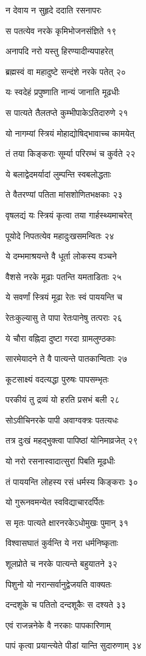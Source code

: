न देवाय न सुहृदे ददाति रसनापरः

स पतत्येव नरके कृमिभोजनसंज्ञिते १९

अनापदि नरो यस्तु हिरण्यादीन्यपाहरेत्

ब्रह्मस्वं वा महादुष्टे सन्दंशे नरके पतेत् २०

यः स्वदेहं प्रपुष्णाति नान्यं जानाति मूढधीः

स पात्यते तैलतप्ते कुम्भीपाकेऽतिदारुणे २१

यो नागम्यां स्त्रियं मोहाद्योषिद्भावाच्च कामयेत्

तं तया किङ्कराः सूर्म्या परिरम्भं च कुर्वते २२

ये बलाद्वेदमर्यादां लुम्पन्ति स्वबलोद्धताः

ते वैतरण्यां पतिता मांसशोणितभक्षकाः २३

वृषलद्यं यः स्त्रियं कृत्वा तया गार्हस्थ्यमाचरेत्

पूयोदे निपतत्येव महादुःखसमन्वितः २४

ये दम्भमाश्रयन्ते वै धूर्ता लोकस्य वञ्चने

वैशसे नरके मूढाः पतन्ति यमताडिताः २५

ये सवर्णां स्त्रियं मूढा रेतः स्वं पाययन्ति च

रेतःकुल्यासु ते पापा रेतःपानेषु तत्पराः २६

ये चौरा वह्निदा दुष्टा गरदा ग्रामलुण्ठकाः

सारमेयादने ते वै पात्यन्ते पातकान्विताः २७

कूटसाक्ष्यं वदत्यद्धा पुरुषः पापसम्भृतः

परकीयं तु द्रव्यं यो हरति प्रसभं बली २८

सोऽवीचिनरके पापी अवाग्वक्त्रः पतत्यधः

तत्र दुःखं महद्भुक्त्वा पापिष्ठां योनिमाव्रजेत् २९

यो नरो रसनास्वादात्सुरां पिबति मूढधीः

तं पाययन्ति लोहस्य रसं धर्मस्य किङ्कराः ३०

यो गुरूनवमन्येत स्वविद्याचारदर्पितः

स मृतः पात्यते क्षारनरकेऽधोमुखः पुमान् ३१

विश्वासघातं कुर्वन्ति ये नरा धर्मनिष्कृताः

शूलप्रोते च नरके पात्यन्ते बहुयातने ३२

पिशुनो यो नरान्सर्वानुद्वेजयति वाक्यतः

दन्दशूके च पतितो दन्दशूकैः स दश्यते ३३

एवं राजन्ननेके वै नरकाः पापकारिणाम्

पापं कृत्वा प्रयान्त्येते पीडां यान्ति सुदारुणाम् ३४

